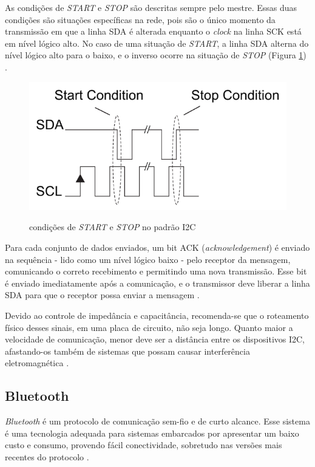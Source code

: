 As condições de \textit{START} e \textit{STOP} são descritas sempre pelo mestre. Essas duas condições são situações específicas na rede, pois são o único momento da transmissão em que a linha SDA é alterada enquanto o \textit{clock} na linha SCK está em nível lógico alto. No caso de uma situação de \textit{START}, a linha SDA alterna do nível lógico alto para o baixo, e o inverso ocorre na situação de \textit{STOP} (Figura \ref{fig:startstopconditioni2c}) \cite{site:analogI2c}.

\begin{figure}[!htb]
	\centering
	\caption{condições de \textit{START} e \textit{STOP} no padrão I2C}
	\includegraphics[width=0.65\linewidth]{figuras/startstopconditioni2c}
	\label{fig:startstopconditioni2c}
\end{figure}

Para cada conjunto de dados enviados, um bit ACK (\textit{acknowledgement}) é enviado na sequência - lido como um nível lógico baixo - pelo receptor da mensagem, comunicando o correto recebimento e permitindo uma nova transmissão. Esse bit é enviado imediatamente após a comunicação, e o transmissor deve liberar a linha SDA para que o receptor possa enviar a mensagem \cite{man:texasI2C}. 

Devido ao controle de impedância e capacitância, recomenda-se que o roteamento físico desses sinais, em uma placa de circuito, não seja longo. Quanto maior a velocidade de comunicação, menor deve ser a distância entre os dispositivos I2C, afastando-os também de sistemas que possam causar interferência eletromagnética \cite{site:altiumpcb}.

\subsection{Bluetooth}

\textit{Bluetooth} é um protocolo de comunicação sem-fio e de curto alcance. Esse sistema é uma tecnologia adequada para sistemas embarcados por apresentar um baixo custo e consumo, provendo fácil conectividade, sobretudo nas versões mais recentes do protocolo \cite{diss:ClaudioBluetooth}. 

